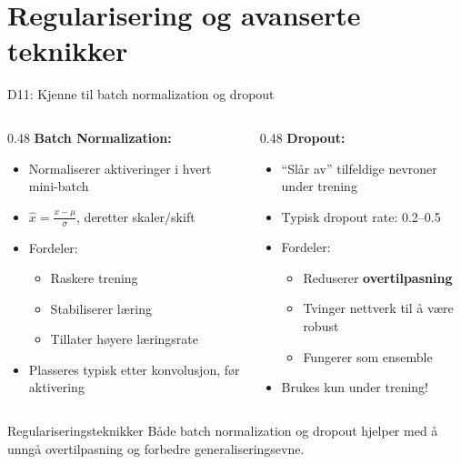 \documentclass[aspectratio=169, 10pt]{beamer}
\begin{document}
\section{Regularisering og avanserte teknikker}

\begin{frame}{D11: Kjenne til batch normalization og dropout}
    \begin{columns}[T]
        \begin{column}{0.48\textwidth}
            \textbf{Batch Normalization:}
            \begin{itemize}
                \item Normaliserer aktiveringer i hvert mini-batch
                \item $\hat{x} = \frac{x - \mu}{\sigma}$, deretter skaler/skift
                \item Fordeler:
                \begin{itemize}
                    \item Raskere trening
                    \item Stabiliserer læring
                    \item Tillater høyere læringsrate
                \end{itemize}
                \item Plasseres typisk etter konvolusjon, før aktivering
            \end{itemize}
        \end{column}
        \begin{column}{0.48\textwidth}
            \textbf{Dropout:}
            \begin{itemize}
                \item ``Slår av'' tilfeldige nevroner under trening
                \item Typisk dropout rate: 0.2--0.5
                \item Fordeler:
                \begin{itemize}
                    \item Reduserer \textbf{overtilpasning}
                    \item Tvinger nettverk til å være robust
                    \item Fungerer som ensemble
                \end{itemize}
                \item Brukes kun under trening!
            \end{itemize}
        \end{column}
    \end{columns}
    
    \vspace{0.5cm}
    \begin{block}{Regulariseringsteknikker}
        Både batch normalization og dropout hjelper med å unngå overtilpasning og forbedre generaliseringsevne.
    \end{block}
\end{frame}
\end{document}
